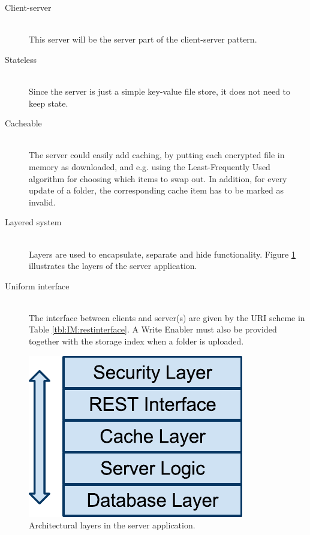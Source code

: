 \documentclass[pdftex,english,10pt,b5paper,twoside]{book}
\begin{document}
\begin{description}
  \item[Client-server] \hfill \\
    This server will be the server part of the client-server pattern.

  \item[Stateless] \hfill \\
    Since the server is just a simple key-value file store, it does
    not need to keep state.

  \item[Cacheable] \hfill \\
    The server could easily add caching, by putting each encrypted file in
    memory as downloaded, and e.g. using the Least-Frequently Used algorithm for
    choosing which items to swap out. In addition, for every update of a folder,
    the corresponding cache item has to be marked as invalid.

  \item[Layered system] \hfill \\
    Layers are used to encapsulate, separate and hide functionality.
    Figure \ref{fig:IM:layers} illustrates the layers of the server application.

  \item[Uniform interface] \hfill \\
    The interface between clients and server(s) are given by the URI scheme in
    Table \ref{tbl:IM:restinterface}. A Write Enabler
    must also be provided together with the storage index when a folder is
    uploaded.
\end{description}

\begin{figure}[h!]
    \centering
    \includegraphics[scale=0.6]{ImplementationServerLayers.pdf}
    \caption{Architectural layers in the server application.}
    \label{fig:IM:layers}
\end{figure}
\end{document}
